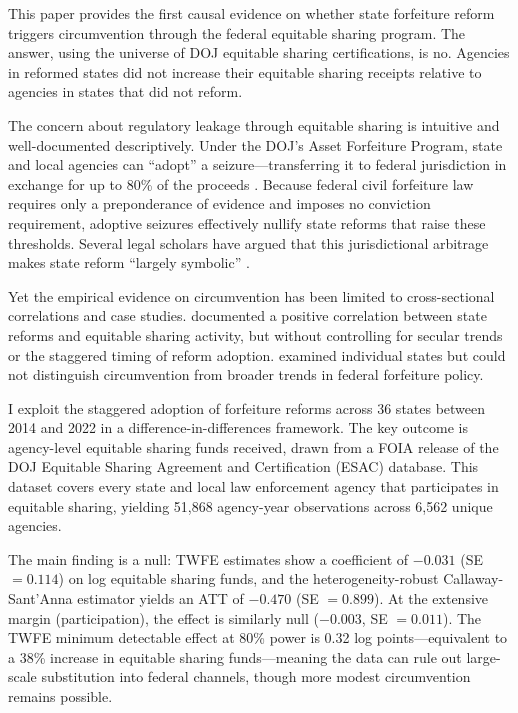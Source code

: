 \documentclass[12pt]{article}
\begin{document}
This paper provides the first causal evidence on whether state forfeiture reform triggers circumvention through the federal equitable sharing program. The answer, using the universe of DOJ equitable sharing certifications, is no. Agencies in reformed states did not increase their equitable sharing receipts relative to agencies in states that did not reform.

The concern about regulatory leakage through equitable sharing is intuitive and well-documented descriptively. Under the DOJ's Asset Forfeiture Program, state and local agencies can ``adopt'' a seizure---transferring it to federal jurisdiction in exchange for up to 80\% of the proceeds \citep{Worrall2004, Baicker2004}. Because federal civil forfeiture law requires only a preponderance of evidence and imposes no conviction requirement, adoptive seizures effectively nullify state reforms that raise these thresholds. Several legal scholars have argued that this jurisdictional arbitrage makes state reform ``largely symbolic'' \citep{Carpenter2019, Nelson2016, Holcomb2018}.

Yet the empirical evidence on circumvention has been limited to cross-sectional correlations and case studies. \citet{CarpenterIJ2020} documented a positive correlation between state reforms and equitable sharing activity, but without controlling for secular trends or the staggered timing of reform adoption. \citet{Holcomb2018} examined individual states but could not distinguish circumvention from broader trends in federal forfeiture policy.

I exploit the staggered adoption of forfeiture reforms across 36 states between 2014 and 2022 in a difference-in-differences framework. The key outcome is agency-level equitable sharing funds received, drawn from a FOIA release of the DOJ Equitable Sharing Agreement and Certification (ESAC) database. This dataset covers every state and local law enforcement agency that participates in equitable sharing, yielding 51,868 agency-year observations across 6,562 unique agencies.

The main finding is a null: TWFE estimates show a coefficient of $-0.031$ (SE $= 0.114$) on log equitable sharing funds, and the heterogeneity-robust Callaway-Sant'Anna estimator yields an ATT of $-0.470$ (SE $= 0.899$). At the extensive margin (participation), the effect is similarly null ($-0.003$, SE $= 0.011$). The TWFE minimum detectable effect at 80\% power is 0.32 log points---equivalent to a 38\% increase in equitable sharing funds---meaning the data can rule out large-scale substitution into federal channels, though more modest circumvention remains possible.
\end{document}
